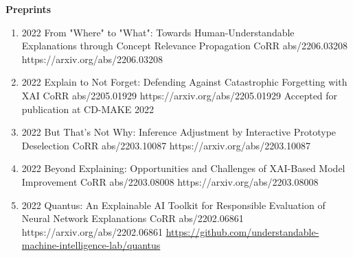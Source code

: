 \documentclass[10pt,a4paper]{article} %
\begin{document}
\headedsection %
{\bf Preprints}{}
{
    \begin{enumerate}

        \item {}
                        {2022}
                        {From "Where" to "What": Towards Human-Understandable Explanations through Concept Relevance Propagation}
                        {CoRR abs/2206.03208}
                        {https://arxiv.org/abs/2206.03208}

        \item {}
                            {2022}
                            {Explain to Not Forget: Defending Against Catastrophic Forgetting with XAI}
                            {CoRR abs/2205.01929}
                            {https://arxiv.org/abs/2205.01929}
                            {Accepted for publication at CD-MAKE 2022}

        \item {}
                            {2022}
                            {But That's Not Why: Inference Adjustment by Interactive Prototype Deselection}
                            {CoRR abs/2203.10087}
                            {https://arxiv.org/abs/2203.10087}

        \item {}
                            {2022}
                            {Beyond Explaining: Opportunities and Challenges of XAI-Based Model Improvement}
                            {CoRR abs/2203.08008}
                            {https://arxiv.org/abs/2203.08008}

        \item {}
                            {2022}
                            {Quantus: An Explainable AI Toolkit for Responsible Evaluation of Neural Network Explanations}
                            {CoRR abs/2202.06861}
                            {https://arxiv.org/abs/2202.06861}
                            {\href{https://github.com/understandable-machine-intelligence-lab/quantus}{https://github.com/understandable-machine-intelligence-lab/quantus}}


\end{enumerate}}
\end{document}
